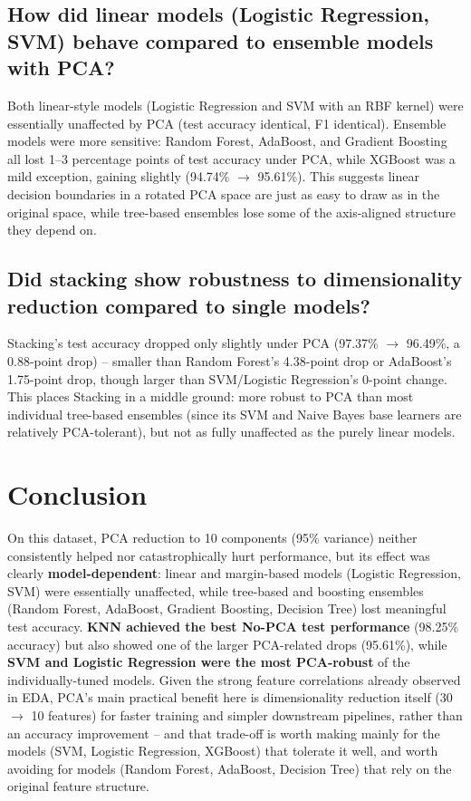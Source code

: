 \documentclass[12pt,a4paper]{article}
\begin{document}
\subsection*{How did linear models (Logistic Regression, SVM) behave compared to ensemble models with PCA?}
Both linear-style models (Logistic Regression and SVM with an RBF kernel) were
essentially unaffected by PCA (test accuracy identical, F1 identical). Ensemble
models were more sensitive: Random Forest, AdaBoost, and Gradient Boosting all
lost 1--3 percentage points of test accuracy under PCA, while XGBoost was a
mild exception, gaining slightly (94.74\% $\rightarrow$ 95.61\%). This suggests
linear decision boundaries in a rotated PCA space are just as easy to draw as in
the original space, while tree-based ensembles lose some of the axis-aligned
structure they depend on.

\subsection*{Did stacking show robustness to dimensionality reduction compared to single models?}
Stacking's test accuracy dropped only slightly under PCA (97.37\% $\rightarrow$
96.49\%, a 0.88-point drop) -- smaller than Random Forest's 4.38-point drop or
AdaBoost's 1.75-point drop, though larger than SVM/Logistic Regression's 0-point
change. This places Stacking in a middle ground: more robust to PCA than most
individual tree-based ensembles (since its SVM and Naive Bayes base learners are
relatively PCA-tolerant), but not as fully unaffected as the purely linear
models.

\section{Conclusion}
On this dataset, PCA reduction to 10 components (95\% variance) neither
consistently helped nor catastrophically hurt performance, but its effect was
clearly \textbf{model-dependent}: linear and margin-based models (Logistic
Regression, SVM) were essentially unaffected, while tree-based and boosting
ensembles (Random Forest, AdaBoost, Gradient Boosting, Decision Tree) lost
meaningful test accuracy. \textbf{KNN achieved the best No-PCA test performance}
(98.25\% accuracy) but also showed one of the larger PCA-related drops (95.61\%),
while \textbf{SVM and Logistic Regression were the most PCA-robust} of the
individually-tuned models. Given the strong feature correlations already observed
in EDA, PCA's main practical benefit here is dimensionality reduction itself (30
$\rightarrow$ 10 features) for faster training and simpler downstream pipelines,
rather than an accuracy improvement -- and that trade-off is worth making mainly
for the models (SVM, Logistic Regression, XGBoost) that tolerate it well, and
worth avoiding for models (Random Forest, AdaBoost, Decision Tree) that rely on
the original feature structure.
\end{document}
